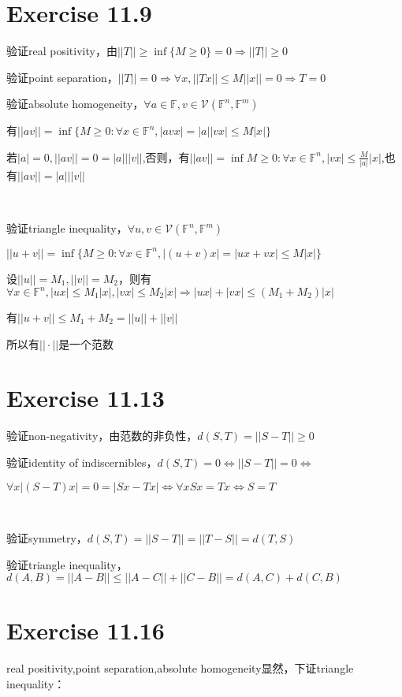 \documentclass[twoside,a4paper]{article}
\begin{document}
\pagestyle{fancy}
\fancyhead{}

\section{Exercise 11.9}

验证real positivity，由$||T||\ge \inf\{M\ge 0\}=0\Rightarrow ||T||\ge 0$

验证point separation，$||T||=0\Rightarrow \forall x,||Tx||\le M||x||=0\Rightarrow T=0$

验证absolute homogeneity，$\forall a\in \mathbb{F},v\in \mathcal{V}(\mathbb{F}^n,\mathbb{F}^m)$

有$||av||=\inf\{M\ge 0:\forall x\in \mathbb{F}^n,|avx|=|a||vx|\le M|x|\}$

若$|a|=0,||av||=0=|a|||v||$,否则，有$||av||=\inf{M\ge 0:\forall x\in \mathbb{F}^n,|vx|\le \frac{M}{|a|}|x|}$,也有$||av||=|a|||v||$

\

验证triangle inequality，$\forall u,v\in \mathcal{V}(\mathbb{F}^n,\mathbb{F}^m)$


$||u+v||=\inf\{M\ge 0:\forall x\in \mathbb{F}^n,|(u+v)x|=|ux+vx|\le M|x|\}$

设$||u||=M_1,||v||=M_2$，则有$\forall x\in \mathbb{F}^n,|ux|\le M_1|x|,|vx|\le M_2|x|\Rightarrow |ux|+|vx|\le (M_1+M_2)|x|$

有$||u+v||\le M_1+M_2=||u||+||v||$

所以有$||\cdot||$是一个范数

\section{Exercise 11.13}
验证non-negativity，由范数的非负性，$d(S,T)=||S-T||\ge 0$

验证identity of indiscernibles，$d(S,T)=0\Leftrightarrow ||S-T||=0 \Leftrightarrow $

$\forall x |(S-T)x|=0=|Sx-Tx|\Leftrightarrow \forall x Sx=Tx \Leftrightarrow S=T$

\

验证symmetry，$d(S,T)=||S-T||=||T-S||=d(T,S)$

验证triangle inequality，$d(A,B)=||A-B||\le ||A-C||+||C-B||=d(A,C)+d(C,B)$

\section{Exercise 11.16}
real positivity,point separation,absolute homogeneity显然，下证triangle inequality：
\end{document}
